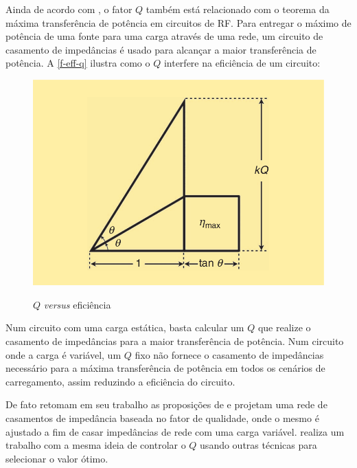 \documentclass[
	article,			%
	11pt,				%
	oneside,			%
	a4paper,			%
	twocolumn,
	english,			%
	brazil,				%
	sumario=tradicional
	]{abntex2}
\begin{document}


Ainda de acordo com \citeauthor{what-is-q-takashi}, o fator $Q$ também está relacionado com o teorema da máxima transferência de potência em circuitos de RF. Para entregar o máximo de potência de uma fonte para uma carga através de uma rede, um circuito de casamento de impedâncias é usado para alcançar a maior transferência de potência. A \autoref{f-eff-q} ilustra como o $Q$ interfere na eficiência de um circuito:


\begin{figure}[H]
    \centering
    \caption{$Q$ \textit{versus} eficiência}
    \includegraphics[width=.5\textwidth]{fig/q-eff.png}
    \label{f-eff-q}
\end{figure}


Num circuito com uma carga estática, basta calcular um $Q$ que realize o casamento de impedâncias para a maior transferência de potência. Num circuito onde a carga é variável, um $Q$ fixo não fornece o casamento de impedâncias necessário para a máxima transferência de potência em todos os cenários de carregamento, assim reduzindo a eficiência do circuito. 

De fato \citeauthor{z-match-q} retomam em seu trabalho as proposições de \citeauthor{what-is-q-takashi} e projetam uma rede de casamentos de impedância baseada no fator de qualidade, onde o mesmo é ajustado a fim de casar impedâncias de rede com uma carga variável. \citeauthor{z-match-q-2} realiza um trabalho com a mesma ideia de controlar o $Q$ usando outras técnicas para selecionar o valor ótimo.


\end{document}
